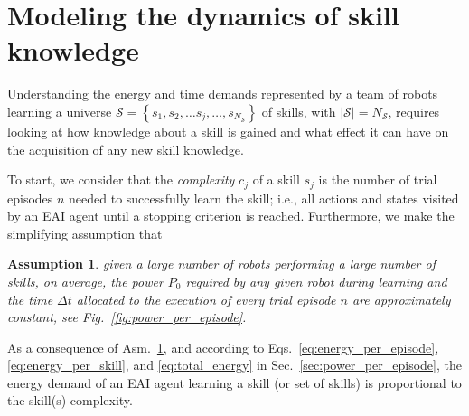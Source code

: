 \documentclass[12pt]{article}
\renewcommand{\emph}[1]{\textit{#1}}
\newtheorem{assumption}{Assumption}
\begin{document}

\section*{Modeling the dynamics of skill knowledge}\label{sec:knowledge_dynamics_model}
Understanding the energy and time demands represented by a team of robots learning a universe $\mathcal{S}=\left\lbrace s_1,s_2,\ldots s_j,\ldots, s_{N_\mathcal{S}}\right\rbrace$ of skills, with $|\mathcal{S}| = N_\mathcal{S}$, requires looking at how knowledge about a skill is gained and what effect it can have on the acquisition of any new skill knowledge. 

To start, we consider that the \emph{complexity} $c_j$ of a skill $ s_j $  is the number of trial episodes $n$ needed to successfully learn the skill; i.e., all actions and states visited by an EAI agent until a stopping criterion is reached. Furthermore, we make the simplifying assumption that
\begin{tcolorbox}
	\begin{assumption}\label{assumption:time}
		given a large number of robots performing a large number of skills, on average, the power $P_0$ required by any given robot during learning and the time $\Delta t$ allocated to the execution of every trial episode $n$ are approximately constant, see Fig.~\ref{fig:power_per_episode}.
	\end{assumption}
\end{tcolorbox}
\noindent As a consequence of Asm.~\ref{assumption:time}, and according to Eqs.~\eqref{eq:energy_per_episode},\eqref{eq:energy_per_skill}, and \eqref{eq:total_energy} in Sec.~\ref{sec:power_per_episode}, the energy demand of an EAI agent learning a skill (or set of skills) is proportional to the skill(s) complexity.
\end{document}
